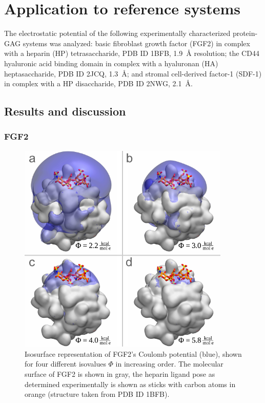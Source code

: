 \section{Application to reference systems}
\label{bspred:application}

The electrostatic potential of the following experimentally characterized
protein-GAG systems was analyzed: basic fibroblast growth factor (FGF2) in
complex with a heparin (HP) tetrasaccharide, PDB ID 1BFB,
\SI{1.9}{\angstrom} resolution; the CD44 hyaluronic acid binding domain in
complex with a hyaluronan (HA) heptasaccharide, PDB ID 2JCQ,
\SI{1.3}{\angstrom}; and stromal cell-derived factor-1 (SDF-1) in complex with a
HP disaccharide, PDB ID 2NWG, \SI{2.1}{\angstrom}.



\subsection{Results and discussion}
\label{bspred:appl_discussion}

\subsubsection{FGF2}

\begin{figure}
\centering
\includegraphics[width=0.9\textwidth]{gfx/bspred/fgf2_coulomb_isosurfaces_different_values_03_ds.pdf}
\caption[]{
Isosurface representation of FGF2's Coulomb potential (blue), shown for four
different isovalues $\Phi$ in increasing order. The molecular surface of FGF2
is shown in gray, the heparin ligand pose as determined experimentally is shown
as sticks with carbon atoms in orange (structure taken from PDB ID 1BFB).}
\label{fig:bspred:fgf2_multi_iso}
\end{figure}

